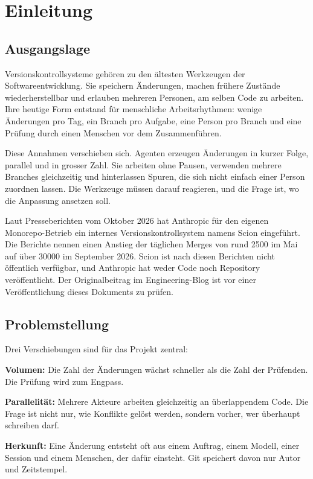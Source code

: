 \chapter{Einleitung}

\section{Ausgangslage}

Versionskontrollsysteme gehören zu den ältesten Werkzeugen der Softwareentwicklung. Sie speichern Änderungen, machen frühere Zustände wiederherstellbar und erlauben mehreren Personen, am selben Code zu arbeiten. Ihre heutige Form entstand für menschliche Arbeitsrhythmen: wenige Änderungen pro Tag, ein Branch pro Aufgabe, eine Person pro Branch und eine Prüfung durch einen Menschen vor dem Zusammenführen.

Diese Annahmen verschieben sich. Agenten erzeugen Änderungen in kurzer Folge, parallel und in grosser Zahl. Sie arbeiten ohne Pausen, verwenden mehrere Branches gleichzeitig und hinterlassen Spuren, die sich nicht einfach einer Person zuordnen lassen. Die Werkzeuge müssen darauf reagieren, und die Frage ist, wo die Anpassung ansetzen soll.

Laut Presseberichten vom Oktober 2026 hat Anthropic für den eigenen Monorepo-Betrieb ein internes Versionskontrollsystem namens Scion eingeführt. Die Berichte nennen einen Anstieg der täglichen Merges von rund 2500 im Mai auf über 30000 im September 2026. Scion ist nach diesen Berichten nicht öffentlich verfügbar, und Anthropic hat weder Code noch Repository veröffentlicht. Der Originalbeitrag im Engineering-Blog ist vor einer Veröffentlichung dieses Dokuments zu prüfen.

\section{Problemstellung}

Drei Verschiebungen sind für das Projekt zentral:

\startitemize
\item \textbf{Volumen:} Die Zahl der Änderungen wächst schneller als die Zahl der Prüfenden. Die Prüfung wird zum Engpass.
\item \textbf{Parallelität:} Mehrere Akteure arbeiten gleichzeitig an überlappendem Code. Die Frage ist nicht nur, wie Konflikte gelöst werden, sondern vorher, wer überhaupt schreiben darf.
\item \textbf{Herkunft:} Eine Änderung entsteht oft aus einem Auftrag, einem Modell, einer Session und einem Menschen, der dafür einsteht. Git speichert davon nur Autor und Zeitstempel.
\stopitemize

